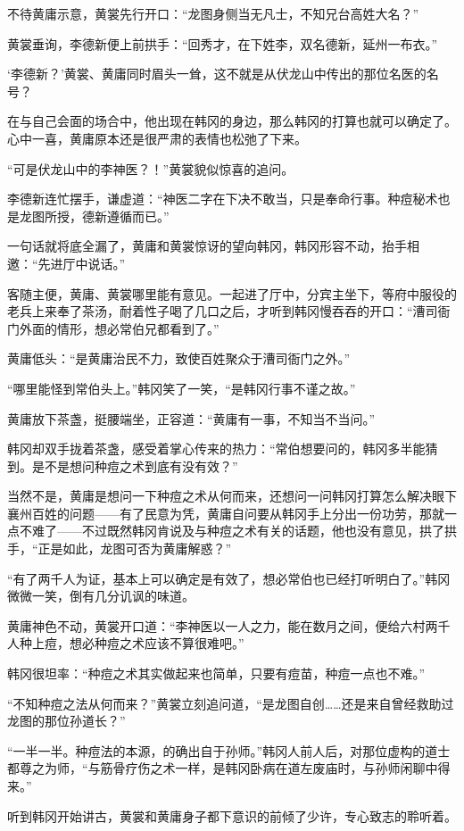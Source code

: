 不待黄庸示意，黄裳先行开口：“龙图身侧当无凡士，不知兄台高姓大名？”

黄裳垂询，李德新便上前拱手：“回秀才，在下姓李，双名德新，延州一布衣。”

‘李德新？’黄裳、黄庸同时眉头一耸，这不就是从伏龙山中传出的那位名医的名号？

在与自己会面的场合中，他出现在韩冈的身边，那么韩冈的打算也就可以确定了。心中一喜，黄庸原本还是很严肃的表情也松弛了下来。

“可是伏龙山中的李神医？！”黄裳貌似惊喜的追问。

李德新连忙摆手，谦虚道：“神医二字在下决不敢当，只是奉命行事。种痘秘术也是龙图所授，德新遵循而已。”

一句话就将底全漏了，黄庸和黄裳惊讶的望向韩冈，韩冈形容不动，抬手相邀：“先进厅中说话。”

客随主便，黄庸、黄裳哪里能有意见。一起进了厅中，分宾主坐下，等府中服役的老兵上来奉了茶汤，耐着性子喝了几口之后，才听到韩冈慢吞吞的开口：“漕司衙门外面的情形，想必常伯兄都看到了。”

黄庸低头：“是黄庸治民不力，致使百姓聚众于漕司衙门之外。”

“哪里能怪到常伯头上。”韩冈笑了一笑，“是韩冈行事不谨之故。”

黄庸放下茶盏，挺腰端坐，正容道：“黄庸有一事，不知当不当问。”

韩冈却双手拢着茶盏，感受着掌心传来的热力：“常伯想要问的，韩冈多半能猜到。是不是想问种痘之术到底有没有效？”

当然不是，黄庸是想问一下种痘之术从何而来，还想问一问韩冈打算怎么解决眼下襄州百姓的问题——有了民意为凭，黄庸自问要从韩冈手上分出一份功劳，那就一点不难了——不过既然韩冈肯说及与种痘之术有关的话题，他也没有意见，拱了拱手，“正是如此，龙图可否为黄庸解惑？”

“有了两千人为证，基本上可以确定是有效了，想必常伯也已经打听明白了。”韩冈微微一笑，倒有几分讥讽的味道。

黄庸神色不动，黄裳开口道：“李神医以一人之力，能在数月之间，便给六村两千人种上痘，想必种痘之术应该不算很难吧。”

韩冈很坦率：“种痘之术其实做起来也简单，只要有痘苗，种痘一点也不难。”

“不知种痘之法从何而来？”黄裳立刻追问道，“是龙图自创……还是来自曾经救助过龙图的那位孙道长？”

“一半一半。种痘法的本源，的确出自于孙师。”韩冈人前人后，对那位虚构的道士都尊之为师，“与筋骨疗伤之术一样，是韩冈卧病在道左废庙时，与孙师闲聊中得来。”

听到韩冈开始讲古，黄裳和黄庸身子都下意识的前倾了少许，专心致志的聆听着。

